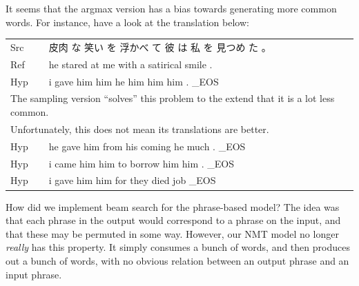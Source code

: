\documentclass[answers]{exam}
\begin{document}
\begin{CJK}{UTF8}{min}
\begin{questions}
\begin{framed}
\begin{compactenum}[1.]
\item
  It seems that the argmax version has a bias towards generating more common
  words. For instance, have a look at the translation below:\\
  \begin{tabular}{ll}
    Src & 皮肉 な 笑い を 浮かべ て 彼 は 私 を 見つめ た 。\\
    Ref & he stared at me with a satirical smile .\\
    Hyp & i gave him him he him him him . \_EOS\\
    \multicolumn{2}{l}{%
    The sampling version ``solves'' this problem to the extend that it is a lot less common.
    }\\
    \multicolumn{2}{l}{%
    Unfortunately, this does not mean its translations are better.
    }\\
    Hyp & he gave him from his coming he much . \_EOS\\
    Hyp & i came him him to borrow him him . \_EOS\\
    Hyp & i gave him him for they died job \_EOS
  \end{tabular}
  \item
    How did we implement beam search for the phrase-based model? The idea was
    that each phrase in the output would correspond to a phrase on the input,
    and that these may be permuted in some way.
    However, our NMT model no longer \emph{really} has this property. It simply
    consumes a bunch of words, and then produces out a bunch of words, with no
    obvious relation between an output phrase and an input phrase.


\end{compactenum}
\end{framed}
\end{questions}
\end{CJK}
\end{document}
